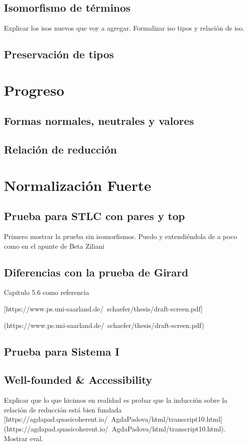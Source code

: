 \documentclass[]{report}
\begin{document}
	\subsection{Isomorfismo de términos}
	Explicar los isos nuevos que voy a agregar. Formalizar iso tipos y relación de iso.
	
	\subsection{Preservación de tipos}
	
	\section{Progreso}
	
	\subsection{Formas normales, neutrales y valores}
	\subsection{Relación de reducción}
	
	\section{Normalización Fuerte}
	
	\subsection{Prueba para STLC con pares y top}
	Primero mostrar la prueba sin isomorfismos. Puedo y extendiéndola de a poco como en el apunte de Beta Ziliani
	\subsection{Diferencias con la prueba de Girard}
	Capitulo 5.6 como referencia
	
	[https://www.ps.uni-saarland.de/~schaefer/thesis/draft-screen.pdf] 
	
	(https://www.ps.uni-saarland.de/~schaefer/thesis/draft-screen.pdf)
	\subsection{Prueba para Sistema I}
	\subsection{Well-founded \& Accessibility}
	Explicar que lo que hicimos en realidad es probar que la inducción sobre la relación de reducción está bien fundada
	[https://agdapad.quasicoherent.io/~AgdaPadova/html/transcript10.html]
	(https://agdapad.quasicoherent.io/~AgdaPadova/html/transcript10.html).
	Mostrar eval.
	
\end{document}
